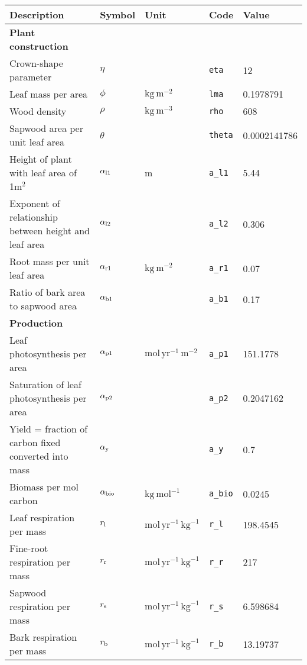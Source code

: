 \begin{tabular}{p{7cm}llll}
  \hline
Description & Symbol & Unit & Code & Value \\ 
  \hline
\textbf{Plant construction} &  &  &  &  \\ 
  Crown-shape parameter & $\eta$ &  & \texttt{eta} & 12 \\ 
  Leaf mass per area & $\phi$ & $\mathrm{kg}\,\mathrm{m}^{-2}$ & \texttt{lma} & 0.1978791 \\ 
  Wood density & $\rho$ & $\mathrm{kg}\,\mathrm{m}^{-3}$ & \texttt{rho} & 608 \\ 
  Sapwood area per unit leaf area & $\theta$ &  & \texttt{theta} & 0.0002141786 \\ 
  Height of plant with leaf area of 1m$^2$ & $\alpha_{\rm l1}$ & m & \texttt{a\_l1} & 5.44 \\ 
  Exponent of relationship between height and leaf area & $\alpha_{\rm l2}$ &  & \texttt{a\_l2} & 0.306 \\ 
  Root mass per unit leaf area & $\alpha_{\rm r1}$ & $\mathrm{kg}\,\mathrm{m}^{-2}$ & \texttt{a\_r1} & 0.07 \\ 
  Ratio of bark area to sapwood area & $\alpha_{\rm b1}$ &  & \texttt{a\_b1} & 0.17 \\ 
  \textbf{Production} &  &  &  &  \\ 
  Leaf photosynthesis per area & $\alpha_{\rm p1}$ & $\mathrm{mol}\,\mathrm{yr}^{-1}\,\mathrm{m}^{-2}$ & \texttt{a\_p1} & 151.1778 \\ 
  Saturation of leaf photosynthesis per area & $\alpha_{\rm p2}$ &  & \texttt{a\_p2} & 0.2047162 \\ 
  Yield = fraction of carbon fixed converted into mass & $\alpha_{\rm y}$ &  & \texttt{a\_y} & 0.7 \\ 
  Biomass per mol carbon & $\alpha_{\rm bio}$ & $\mathrm{kg}\,\mathrm{mol}^{-1}$ & \texttt{a\_bio} & 0.0245 \\ 
  Leaf respiration per mass & $r_{\rm l}$ & $\mathrm{mol}\,\mathrm{yr}^{-1}\,\mathrm{kg}^{-1}$ & \texttt{r\_l} & 198.4545 \\ 
  Fine-root respiration per mass & $r_{\rm r}$ & $\mathrm{mol}\,\mathrm{yr}^{-1}\,\mathrm{kg}^{-1}$ & \texttt{r\_r} & 217 \\ 
  Sapwood respiration per mass & $r_{\rm s}$ & $\mathrm{mol}\,\mathrm{yr}^{-1}\,\mathrm{kg}^{-1}$ & \texttt{r\_s} & 6.598684 \\ 
  Bark respiration per mass & $r_{\rm b}$ & $\mathrm{mol}\,\mathrm{yr}^{-1}\,\mathrm{kg}^{-1}$ & \texttt{r\_b} & 13.19737 \\ 

\end{tabular}
